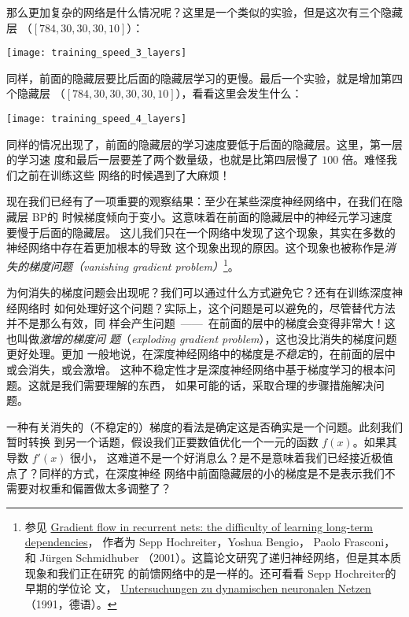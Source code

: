 那么更加复杂的网络是什么情况呢？这里是一个类似的实验，但是这次有三个隐藏层
（$[784, 30, 30, 30, 10]$）：
\begin{center}
  \texttt{[image: training\_speed\_3\_layers]}
\end{center}
 
同样，前面的隐藏层要比后面的隐藏层学习的更慢。最后一个实验，就是增加第四个隐藏层
（$[784, 30, 30, 30, 30, 10]$），看看这里会发生什么：
\begin{center}
  \texttt{[image: training\_speed\_4\_layers]}
\end{center}
 
同样的情况出现了，前面的隐藏层的学习速度要低于后面的隐藏层。这里，第一层的学习速
度和最后一层要差了两个数量级，也就是比第四层慢了 $100$ 倍。难怪我们之前在训练这些
网络的时候遇到了大麻烦！
 
现在我们已经有了一项重要的观察结果：至少在某些深度神经网络中，在我们在隐藏层 BP的
时候梯度倾向于变小。这意味着在前面的隐藏层中的神经元学习速度要慢于后面的隐藏层。
这儿我们只在一个网络中发现了这个现象，其实在多数的神经网络中存在着更加根本的导致
这个现象出现的原因。这个现象也被称作是\emph{消失的梯度问题（vanishing gradient
  problem）}\footnote{参见
  \href{http://citeseerx.ist.psu.edu/viewdoc/summary?doi=10.1.1.24.7321}{Gradient
    flow in recurrent nets: the difficulty of learning long-term dependencies}，
  作者为 Sepp Hochreiter，Yoshua Bengio， Paolo Frasconi， 和 Jürgen
  Schmidhuber （2001）。这篇论文研究了递归神经网络，但是其本质现象和我们正在研究
  的前馈网络中的是一样的。还可看看 Sepp Hochreiter的早期的学位论
  文，
  \href{http://www.idsia.ch/~juergen/SeppHochreiter1991ThesisAdvisorSchmidhuber.pdf}{Untersuchungen
    zu dynamischen neuronalen Netzen} （1991，德语）。}。
 
为何消失的梯度问题会出现呢？我们可以通过什么方式避免它？还有在训练深度神经网络时
如何处理好这个问题？实际上，这个问题是可以避免的，尽管替代方法并不是那么有效，同
样会产生问题~——~在前面的层中的梯度会变得非常大！这也叫做\emph{激增的梯度问
  题}（\emph{exploding gradient problem}），这也没比消失的梯度问题更好处理。更加
一般地说，在深度神经网络中的梯度是\emph{不稳定}的，在前面的层中或会消失，或会激增。
这种不稳定性才是深度神经网络中基于梯度学习的根本问题。这就是我们需要理解的东西，
如果可能的话，采取合理的步骤措施解决问题。
 
一种有关消失的（不稳定的）梯度的看法是确定这是否确实是一个问题。此刻我们暂时转换
到另一个话题，假设我们正要数值优化一个一元的函数 $f(x)$。如果其导数 $f'(x)$ 很小，
这难道不是一个好消息么？是不是意味着我们已经接近极值点了？同样的方式，在深度神经
网络中前面隐藏层的小的梯度是不是表示我们不需要对权重和偏置做太多调整了？
 
